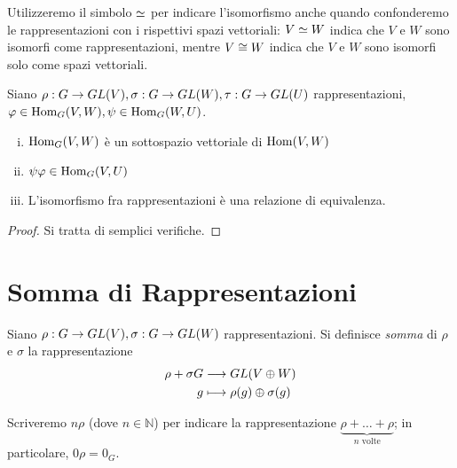 Utilizzeremo il simbolo $\simeq$ per indicare l'isomorfismo anche quando confonderemo le rappresentazioni con i rispettivi spazi vettoriali: $V\simeq W$ indica che $V$ e $W$ sono isomorfi come rappresentazioni, mentre $V\cong W$ indica che $V$ e $W$ sono isomorfi solo come spazi vettoriali.

\begin{proposition}
Siano $\rho:G\to GL(V),\allowbreak\sigma:G\to GL(W),\allowbreak\tau:G\to GL(U)$ rappresentazioni, $\varphi\in\operatorname{Hom}_G(V,W),\allowbreak\psi\in\operatorname{Hom}_G(W,U)$.
\begin{enumerate}[(i)]
\item $\operatorname{Hom}_G(V,W)$ è un sottospazio vettoriale di $\operatorname{Hom}(V,W)$
\item $\psi\varphi\in\operatorname{Hom}_G(V,U)$
\item L'isomorfismo fra rappresentazioni è una relazione di equivalenza.
\end{enumerate}
\end{proposition}
\begin{proof}
Si tratta di semplici verifiche.
\end{proof}

\section{Somma di Rappresentazioni}

\begin{definition}
Siano $\rho:G\to GL(V),\allowbreak\sigma:G\to GL(W)$ rappresentazioni. Si definisce \emph{somma} di $\rho$ e $\sigma$ la rappresentazione
\begin{align*}
\rho+\sigma G&\longrightarrow GL(V\oplus W)\\
g&\longmapsto\rho(g)\oplus\sigma(g)
\end{align*}
\end{definition}

Scriveremo $n\rho$ (dove $n\in\mathbb{N}$) per indicare la rappresentazione $\underbrace{\rho+\ldots+\rho}_{\text{$n$ volte}}$; in particolare, $0\rho=0_G$.

